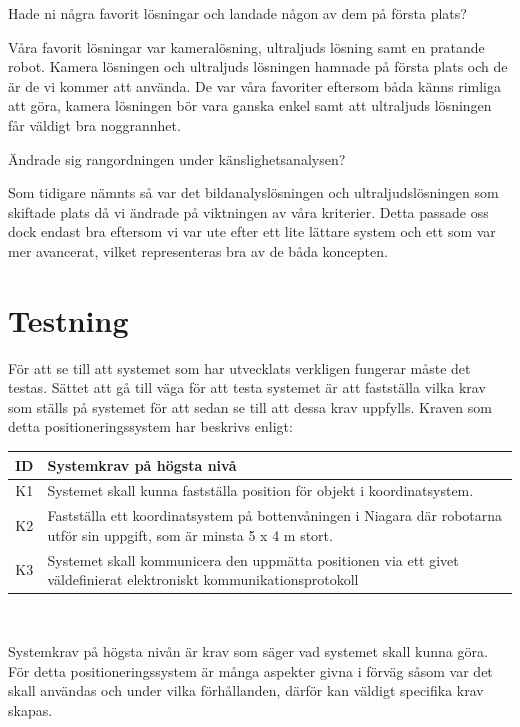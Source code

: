 \documentclass[11pt, a4paper]{report}
\begin{document}
Hade ni några favorit lösningar och landade någon av dem på första plats?

Våra favorit lösningar var kameralösning, ultraljuds lösning samt en pratande robot. Kamera lösningen och ultraljuds lösningen hamnade på första plats och de är de vi kommer att använda. De var våra favoriter eftersom båda känns rimliga att göra, kamera lösningen bör vara ganska enkel samt att ultraljuds lösningen får väldigt bra noggrannhet.

Ändrade sig rangordningen under känslighetsanalysen?

Som tidigare nämnts så var det bildanalyslösningen och ultraljudslösningen som skiftade plats då vi ändrade på viktningen av våra kriterier. Detta passade oss dock endast bra eftersom vi var ute efter ett lite lättare system och ett som var mer avancerat, vilket representeras bra av de båda koncepten. 


\section{Testning}
För att se till att systemet som har utvecklats verkligen fungerar måste det testas. Sättet att gå till väga för att testa systemet är att fastställa vilka krav som ställs på systemet för att sedan se till att dessa krav uppfylls. Kraven som detta positioneringssystem har beskrivs enligt:

\begin{center}
	\begin{tabular}{c | p{13.5cm}}
	ID & Systemkrav på högsta nivå \\ \hline
	K1 & Systemet skall kunna fastställa position för objekt i koordinatsystem. \\
	K2 & Fastställa ett koordinatsystem på bottenvåningen i Niagara där robotarna utför sin uppgift, som är minsta 5 x 4 m stort. \\
	K3 & Systemet skall kommunicera den uppmätta positionen via ett givet väldefinierat elektroniskt kommunikationsprotokoll \\
	\end{tabular}
	\\ [0.5cm]
\end{center}

	Systemkrav på högsta nivån är krav som säger vad systemet skall kunna göra. För detta positioneringssystem är många aspekter givna i förväg såsom var det skall användas och under vilka förhållanden, därför kan väldigt specifika krav skapas.
	
\end{document}
